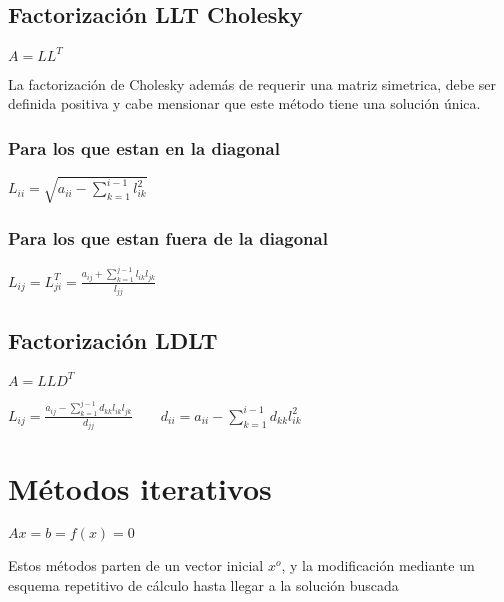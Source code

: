 \subsection{Factorizaci\'on LLT Cholesky}
\begin{center}
$ A=LL^T$
\end{center}
La factorizaci\'on de Cholesky adem\'as de requerir una matriz simetrica, debe ser definida positiva y cabe mensionar que este m\'etodo tiene una soluci\'on \'unica.
\subsubsection*{Para los que estan en la diagonal}
\begin{center}
$L_{ii}=\sqrt{a_{ii}-\sum_{k=1}^{i-1}l_{ik}^2}$
\subsubsection*{Para los que estan fuera de la diagonal}
\begin{center}
$L_{ij}=L^T_{ji}=\frac{a_{ij}+\sum_{k=1}^{j-1}l_{ik}l_{jk}}{l_{jj}}$
\end{center}
\end{center}
\subsection{Factorizaci\'on LDLT}
\begin{center}
$ A=LLD^T $
\end{center}
\begin{center}
$L_{ij}=\frac{a_{ij}-\sum_{k=1}^{j-1}d_{kk}l_{ik}l_{jk}}{d_{jj}} \qquad d_{ii}=a_{ii}-\sum_{k=1}^{i-1}d_{kk}l_{ik}^2$
\end{center}
\section{M\'etodos iterativos }
\begin{center}
$Ax=b=f(x)=0$
\end{center}
Estos m\'etodos parten de un vector inicial $x^o$, y la modificaci\'on mediante un esquema repetitivo de c\'alculo hasta llegar a la soluci\'on buscada
